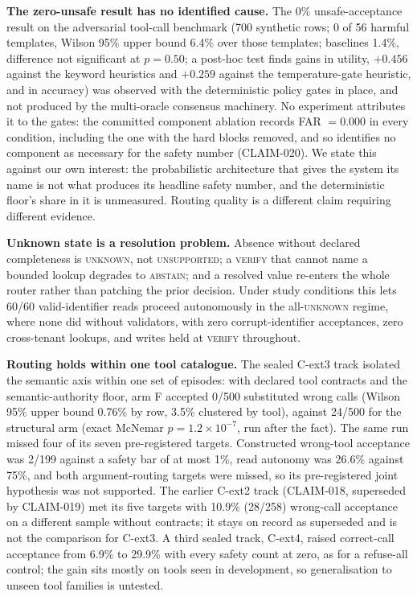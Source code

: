 \documentclass[10pt,twocolumn]{article}
\begin{document}
\textbf{The zero-unsafe result has no identified cause.} The
0\% unsafe-acceptance result on the adversarial tool-call benchmark (700
synthetic rows; 0 of 56 harmful templates, Wilson 95\% upper bound 6.4\%
over those templates; baselines 1.4\%, difference not significant at
$p=0.50$; a post-hoc test finds gains in utility, $+0.456$ against the
keyword heuristics and $+0.259$ against the temperature-gate heuristic,
and in accuracy) was observed with the deterministic policy gates in place, and
not produced by the multi-oracle consensus machinery. No experiment
attributes it to the gates: the committed component ablation records FAR
$=0.000$ in every condition,
including the one with the hard blocks removed, and so identifies no
component as necessary for the safety number (CLAIM-020). We state this against our
own interest: the probabilistic architecture that gives the system its
name is not what produces its headline safety number, and the
deterministic floor's share in it is unmeasured. Routing quality is a
different claim requiring different evidence.

\textbf{Unknown state is a resolution problem.} Absence without declared
completeness is \textsc{unknown}, not \textsc{unsupported}; a
\textsc{verify} that cannot name a bounded lookup degrades to
\textsc{abstain}; and a resolved value re-enters the whole router rather
than patching the prior decision. Under study conditions this lets 60/60
valid-identifier reads proceed autonomously in the all-\textsc{unknown}
regime, where none did without validators, with
zero corrupt-identifier acceptances, zero cross-tenant lookups, and
writes held at \textsc{verify} throughout.

\textbf{Routing holds within one tool catalogue.} The sealed C-ext3 track
isolated the semantic axis within one set of episodes: with declared tool
contracts and the semantic-authority floor, arm F accepted 0/500
substituted wrong calls (Wilson 95\% upper bound 0.76\% by row, 3.5\%
clustered by tool), against 24/500 for the structural arm (exact McNemar
$p = 1.2\times10^{-7}$, run after the fact). The same run missed four of
its seven pre-registered targets. Constructed wrong-tool acceptance was
2/199 against a safety bar of at most 1\%, read autonomy was 26.6\%
against 75\%, and both argument-routing targets were missed, so its
pre-registered joint hypothesis was not supported. The earlier C-ext2
track (CLAIM-018, superseded by CLAIM-019) met its five targets with
10.9\% (28/258) wrong-call acceptance on a different sample without
contracts; it stays on record as superseded and is not the comparison for
C-ext3. A third sealed track, C-ext4, raised
correct-call acceptance from 6.9\% to 29.9\% with every safety count at
zero, as for a refuse-all control; the gain sits mostly on tools seen in development, so generalisation
to unseen tool families is untested.
\end{document}
